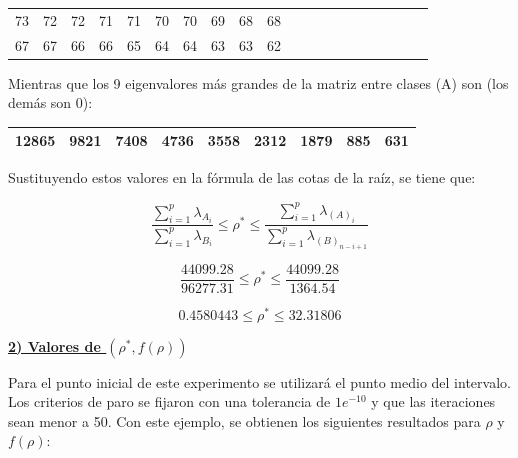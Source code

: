 \begin{center}
\begin{tabular}{ | c | c|  c |c | c|  c |c | c|  c |c | c | c|  c |c | c|  c |c | c|  c |c |} 
\hline
73 & 72 & 72 & 71 & 71 & 70 & 70 & 69 & 68 & 68 \\
67 & 67 & 66 & 66 & 65 & 64 & 64 & 63 & 63 & 62 \\
\hline
\hline
\end{tabular}
\end{center}

Mientras que los 9 eigenvalores más grandes de la matriz entre clases (A) son (los demás son 0):

\begin{center}
\begin{tabular}{ | c | c|  c |c | c|  c |c | c|  c |} 
\hline
12865 & 9821 & 7408 & 4736 & 3558 & 2312 & 1879 & 885 & 631 \\
\hline
\hline
\end{tabular}
\end{center}

Sustituyendo estos valores en la fórmula de las cotas de la raíz, se tiene que:

\begin{equation*}
\frac{\sum_{i = 1}^{p}\lambda_{A_i}}{\sum_{i = 1}^{p}\lambda_{B_i}} \leq \rho^* \leq \frac{\sum_{i = 1}^{p}\lambda_{(A)_i}}{\sum_{i = 1}^{p}\lambda_{(B)_{n-i+1}}}	
\end{equation*}

\begin{equation*}
\frac{44099.28}{96277.31} \leq \rho^* \leq \frac{44099.28}{1364.54}
\end{equation*}

\begin{equation*}
0.4580443 \leq \rho^* \leq 32.31806
\end{equation*}

\underline{\textbf{2) Valores de $(\rho^*, f(\rho))$}}

Para el punto inicial de este experimento se utilizará el punto medio del intervalo. Los criterios de paro se fijaron con una tolerancia de $1e^{-10}$ y que las iteraciones sean menor a 50. Con este ejemplo, se obtienen los siguientes resultados para $\rho$ y $f(\rho)$:

